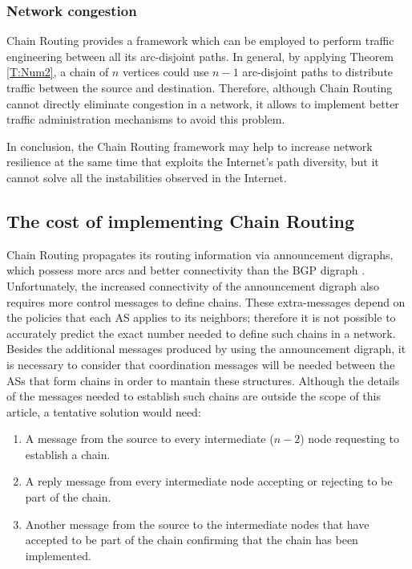 \documentclass[5p,twocolumn]{elsarticle}
\begin{document}
\subsubsection{Network congestion}

Chain Routing provides a framework which can be employed to perform traffic engineering between all its arc-disjoint paths. In general, by applying Theorem \ref{T:Num2}, a chain of $n$ vertices could use $n-1$ arc-disjoint paths to distribute traffic between the source and destination. Therefore, although Chain Routing cannot directly eliminate congestion in a network, it allows to implement better traffic administration mechanisms to avoid this problem.

In conclusion, the Chain Routing framework may help to increase network resilience at the same time that exploits the Internet's path diversity, but it cannot solve all the instabilities observed in the Internet.


\subsection{The cost of implementing Chain Routing}\label{the_cost}



Chain Routing propagates its routing information via announcement digraphs, which possess more arcs and better connectivity than the BGP digraph \cite{Arjona-Villicana2010}. Unfortunately, the increased connectivity of the announcement digraph also requires more control messages to define chains. These extra-messages depend on the policies that each AS applies to its neighbors; therefore it is not possible to accurately predict the exact number needed to define such chains in a network. Besides the additional messages produced by using the announcement digraph, it is necessary to consider that coordination messages will be needed between the ASs that form chains in order to mantain these structures. Although the details of the messages needed to establish such chains are outside the scope of this article, a tentative solution would need:

\begin{enumerate}
	\item A message from the source to every intermediate ($n-2$) node requesting to establish a chain.
	\item A reply message from every intermediate node accepting or rejecting to be part of the chain.
	\item Another message from the source to the intermediate nodes that have accepted to be part of the chain confirming that the chain has been implemented.
\end{enumerate}
\end{document}
